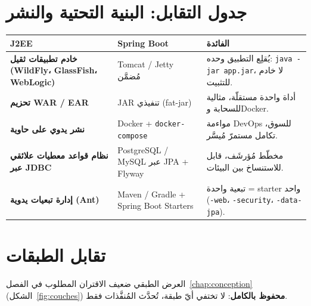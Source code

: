 \section{جدول التقابل: البنية التحتية والنشر}
\begin{xltabular}{\textwidth}{>{\bfseries}p{4cm} p{4.5cm} X}
\toprule
\textbf{J2EE} & \textbf{Spring Boot} & \textbf{الفائدة} \\
\midrule
\endhead
خادم تطبيقات ثقيل (WildFly، GlassFish، WebLogic) & Tomcat / Jetty مُضمَّن & يُقلِع التطبيق وحده: \texttt{java -jar app.jar}، لا خادم للتثبيت. \\
تحزيم WAR / EAR & JAR تنفيذي (fat-jar) & أداة واحدة مستقلّة، مثالية للسحابة وDocker. \\
نشر يدوي على حاوية & Docker + \texttt{docker-compose} & مواءمة DevOps للسوق، تكامل مستمرّ مُيسَّر. \\
نظام قواعد معطيات علائقي عبر JDBC & PostgreSQL / MySQL عبر JPA + Flyway & مخطّط مُؤرشَف، قابل للاستنساخ بين البيئات. \\
إدارة تبعيات يدوية (Ant) & Maven / Gradle + Spring Boot Starters & تبعية واحدة = starter واحد (\texttt{-web}، \texttt{-security}، \texttt{-data-jpa}). \\
\bottomrule
\end{xltabular}

\section{تقابل الطبقات}
العرض الطبقي ضعيف الاقتران المطلوب في الفصل~\ref{chap:conception}
(الشكل~\ref{fig:couches}) \textbf{محفوظ بالكامل}: لا تختفي أيّ طبقة، تُحدَّث
المُنفَّذات فقط.

